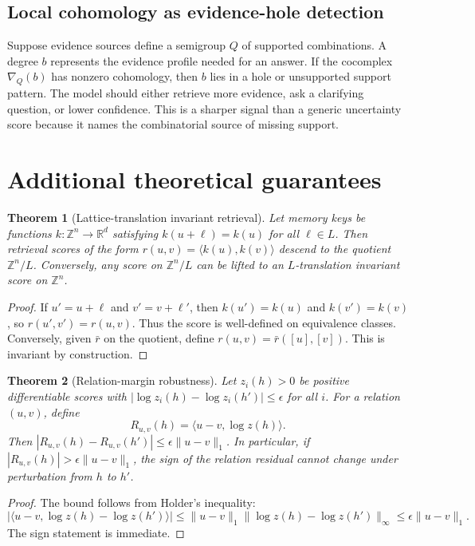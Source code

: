 \documentclass[11pt]{article}
\newtheorem{theorem}{Theorem}[section]
\theoremstyle{definition}
\newcommand{\ZZ}{\mathbb{Z}}
\newcommand{\RR}{\mathbb{R}}
\begin{document}
\subsection{Local cohomology as evidence-hole detection}
Suppose evidence sources define a semigroup \(Q\) of supported combinations.  A degree \(b\) represents the evidence profile needed for an answer.  If the cocomplex \(\nabla_Q(b)\) has nonzero cohomology, then \(b\) lies in a hole or unsupported support pattern.  The model should either retrieve more evidence, ask a clarifying question, or lower confidence.  This is a sharper signal than a generic uncertainty score because it names the combinatorial source of missing support.

\section{Additional theoretical guarantees}
\begin{theorem}[Lattice-translation invariant retrieval]
Let memory keys be functions \(k:\ZZ^n\to\RR^d\) satisfying \(k(u+\ell)=k(u)\) for all \(\ell\in L\).  Then retrieval scores of the form \(r(u,v)=\langle k(u),k(v)\rangle\) descend to the quotient \(\ZZ^n/L\).  Conversely, any score on \(\ZZ^n/L\) can be lifted to an \(L\)-translation invariant score on \(\ZZ^n\).
\end{theorem}
\begin{proof}
If \(u' = u+\ell\) and \(v'=v+\ell'\), then \(k(u')=k(u)\) and \(k(v')=k(v)\), so \(r(u',v')=r(u,v)\).  Thus the score is well-defined on equivalence classes.  Conversely, given \(\bar r\) on the quotient, define \(r(u,v)=\bar r([u],[v])\).  This is invariant by construction.
\end{proof}

\begin{theorem}[Relation-margin robustness]
Let \(z_i(h)>0\) be positive differentiable scores with \(|\log z_i(h)-\log z_i(h')|\le \epsilon\) for all \(i\).  For a relation \((u,v)\), define
\[
R_{u,v}(h)=\langle u-v,\log z(h)\rangle.
\]
Then \(|R_{u,v}(h)-R_{u,v}(h')|\le \epsilon\|u-v\|_1\).  In particular, if \(|R_{u,v}(h)|>\epsilon\|u-v\|_1\), the sign of the relation residual cannot change under perturbation from \(h\) to \(h'\).
\end{theorem}
\begin{proof}
The bound follows from Holder's inequality:
\[
|\langle u-v,\log z(h)-\log z(h')\rangle|\le \|u-v\|_1\|\log z(h)-\log z(h')\|_\infty\le \epsilon\|u-v\|_1.
\]
The sign statement is immediate.
\end{proof}
\end{document}

